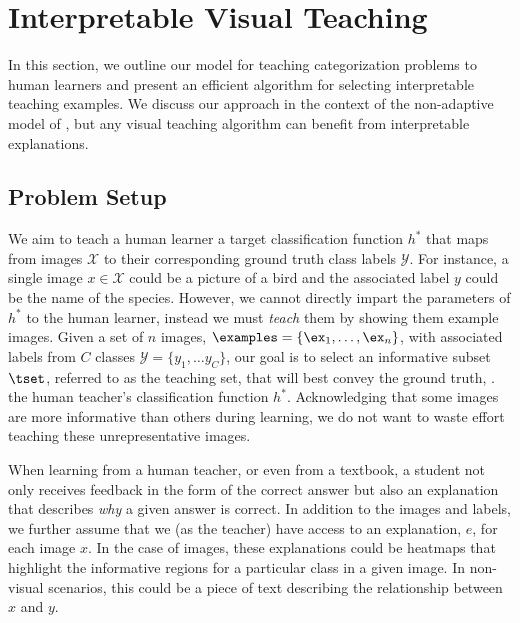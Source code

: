 \documentclass[../main.tex]{subfiles}
\begin{document}
\vspace{-5pt}
\section{Interpretable Visual Teaching}
In this section, we outline our model for teaching categorization problems to human learners and present an efficient algorithm for selecting interpretable teaching examples. 
We discuss our approach in the context of the non-adaptive model of \cite{singla2014near}, but any visual teaching algorithm can benefit from interpretable explanations.



\subsection{Problem Setup}
We aim to teach a human learner a target classification function $h^*$ that maps from images $\mathcal{X}$ to their corresponding ground truth class labels $\mathcal{Y}$.
For instance, a single image $x \in \mathcal{X}$ could be a picture of a bird and the associated label $y$ could be the name of the species. 
However, we cannot directly impart the parameters of $h^*$ to the human learner, instead we must \emph{teach} them by showing them example images. 
Given a set of $n$ images, $\examples = \{\ex_1,\dots, \ex_n\}$, with associated labels from $C$ classes $\mathcal{Y} = \{y_1, \dotsc y_C \}$, our goal is to select an informative subset $\tset$, referred to as the teaching set, that will best convey the ground truth, \ie. the human teacher's classification function $h^*$.
Acknowledging that some images are more informative than others during learning, we do not want to waste effort teaching these unrepresentative images. 

When learning from a human teacher, or even from a textbook, a student not only receives feedback in the form of the correct answer but also an explanation that describes \emph{why} a given answer is correct.
In addition to the images and labels, we further assume that we (as the teacher) have access to an explanation, $e$, for each image $x$. 
In the case of images, these explanations could be heatmaps that highlight the informative regions for a particular class in a given image. 
In non-visual scenarios, this could be a piece of text describing the relationship between $x$ and $y$. 
\end{document}
